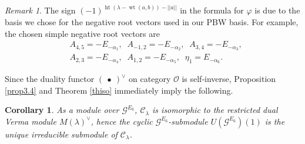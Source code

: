 \documentclass[12pt]{article}
\numberwithin{equation}{section}
\newtheorem{corollary}[theorem]{Corollary}
\theoremstyle{definition}
\theoremstyle{remark}
\newtheorem{remark}[theorem]{Remark}
\begin{document}
\begin{remark}
	The sign $(-1)^{\operatorname{ht}(\lambda-\operatorname{wt}(a,b))-||a||}$ in the formula for $\varphi$ is due to the basis we chose for the negative root vectors used in our PBW basis. For example, the chosen simple negative root vectors are
	\begin{eqnarray}
		&A_{4,5}=-E_{-\alpha_1},\;\;A_{-1,2}=-E_{-\alpha_2},\;\;A_{3,4}=-E_{-\alpha_3},\nonumber\\
		&A_{2,3}=-E_{-\alpha_4},\;\;A_{1,2}=-E_{-\alpha_5},\;\;\eta_1=E_{-\alpha_6}.
	\end{eqnarray}
\end{remark}

Since the duality functor $(~\bullet~)^{\vee}$ on category $\mathcal{O}$ is self‑inverse, Proposition \ref{prop3.4} and Theorem \ref{thiso} immediately imply the following.
\begin{corollary}\label{Coro3.6}
	As a module over $\mathscr{G}^{E_6}$, $\mathscr{C}_{\lambda}$ is isomorphic to the restricted dual Verma module $M(\lambda)^{\vee}$, hence the cyclic $\mathscr{G}^{E_6}$-submodule $U(\mathscr{G}^{E_6})(1)$ is the unique irreducible submodule of $\mathscr{C}_{\lambda}$.
\end{corollary}
\end{document}
